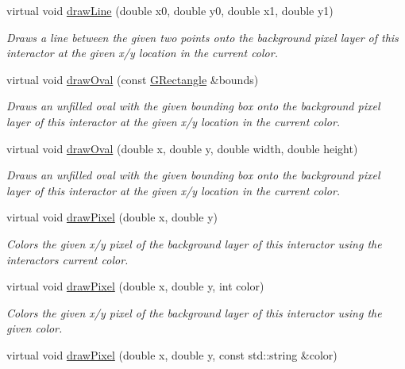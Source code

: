 \begin{DoxyCompactItemize}
virtual void \mbox{\hyperlink{classGDrawingSurface_aff299fe83178d2f3ce8c08c06b583484}{draw\+Line}} (double x0, double y0, double x1, double y1)
\begin{DoxyCompactList}\small\item\em Draws a line between the given two points onto the background pixel layer of this interactor at the given x/y location in the current color. \end{DoxyCompactList}\item 
virtual void \mbox{\hyperlink{classGDrawingSurface_a8adc13027efe311b4a6a715205b8bc46}{draw\+Oval}} (const \mbox{\hyperlink{structGRectangle}{G\+Rectangle}} \&bounds)
\begin{DoxyCompactList}\small\item\em Draws an unfilled oval with the given bounding box onto the background pixel layer of this interactor at the given x/y location in the current color. \end{DoxyCompactList}\item 
virtual void \mbox{\hyperlink{classGDrawingSurface_aa5b1cf902e578907da3c63060686354e}{draw\+Oval}} (double x, double y, double width, double height)
\begin{DoxyCompactList}\small\item\em Draws an unfilled oval with the given bounding box onto the background pixel layer of this interactor at the given x/y location in the current color. \end{DoxyCompactList}\item 
virtual void \mbox{\hyperlink{classGDrawingSurface_a0c1e2923d8d163d62d0896d8c5cfa191}{draw\+Pixel}} (double x, double y)
\begin{DoxyCompactList}\small\item\em Colors the given x/y pixel of the background layer of this interactor using the interactor\textquotesingle{}s current color. \end{DoxyCompactList}\item 
virtual void \mbox{\hyperlink{classGDrawingSurface_a3a64eb6383e601be8438e9c71643c432}{draw\+Pixel}} (double x, double y, int color)
\begin{DoxyCompactList}\small\item\em Colors the given x/y pixel of the background layer of this interactor using the given color. \end{DoxyCompactList}\item 
virtual void \mbox{\hyperlink{classGDrawingSurface_a20abc26a94b7eb310e34abf668e0f5f4}{draw\+Pixel}} (double x, double y, const std\+::string \&color)

\end{DoxyCompactItemize}
